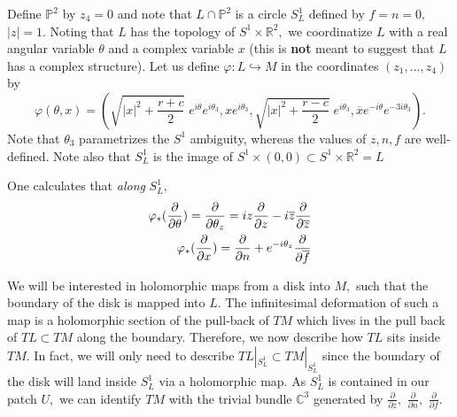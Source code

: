\documentclass[a4paper,11pt]{article}
\newcommand{\PP}{{\mathbb{P}}}
\newcommand{\C}{\mathbb{C}}
\newcommand{\R}{\mathbb{R}}
\begin{document}
Define $\PP^2$ by $z_4 = 0$ and note that $L\cap \PP^2$
is a circle $S^1_L$ defined by
$f = n = 0,$ $|z| = 1.$ 
Noting that $L$ has the topology of $S^1 \times \R^2,$
we coordinatize $L$ with a real angular variable $\theta$
and a complex variable $x$ (this is {\bf not} meant
to suggest that $L$
has a complex structure).
Let us define $\varphi: L\hookrightarrow M$ in the
coordinates $(z_1,...,z_4)$ by
$$\varphi(\theta,x) = (\sqrt{|x|^2 + \frac{r+c}{2}}\; e^{i\theta}
e^{i\theta_3},
xe^{i\theta_3},\sqrt{|x|^2 + \frac{r-c}{2}}\; e^{i\theta_3},
\overline{x}e^{-i\theta}e^{-3i\theta_3}).$$
Note that $\theta_3$ parametrizes the $S^1$ ambiguity,
whereas the values
of $z,n,f$ are well-defined.
Note also that $S^1_L$ is the image
of $S^1\times (0,0)\subset S^1\times \R^2 = L$

One calculates that {\em along} $S^1_L,$
\begin{eqnarray}
\label{push}
\varphi_*(\frac{\partial}{\partial \theta}) =
\frac{\partial}{\partial \theta_z} =
iz\frac{\partial}{\partial z} - i\overline{z}\frac{\partial}{\partial
\overline{z}}\cr
\varphi_*(\frac{\partial}{\partial x}) =
\frac{\partial}{\partial n} + e^{-i\theta_z}
\frac{\partial}{\partial \overline{f}}
\end{eqnarray}


We will be interested in
holomorphic maps from a disk into $M,$ such that
the boundary of the disk is mapped into $L.$  The infinitesimal
deformation of such a map is a holomorphic section of the
pull-back of $TM$ which lives in the pull back of $TL \subset TM$
along the boundary.  Therefore, we now describe how $TL$ sits
inside $TM.$  In fact, we will only need to describe $TL|_{S^1_L}
\subset TM|_{S^1_L}$ since the boundary of the disk will land inside
$S^1_L$ via a holomorphic map.  As $S^1_L$ is contained in our patch
$U,$ we can identify $TM$ with the trivial bundle
$\C^3$ generated by
$\frac{\partial}{\partial z},$
$\frac{\partial}{\partial n},$
$\frac{\partial}{\partial f}.$
\end{document}
